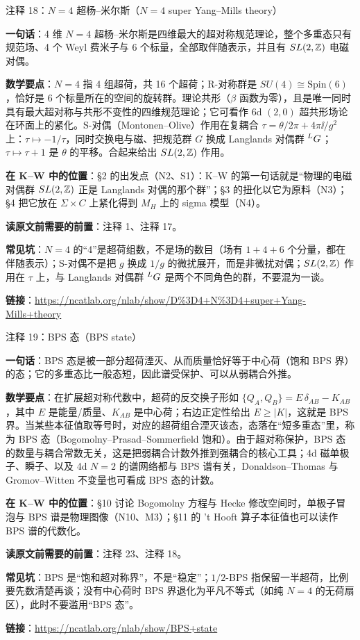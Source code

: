 \begin{kcard}{注释 18：$N=4$ 超杨--米尔斯（$N=4$ super Yang--Mills theory）}

\textbf{一句话}：4 维 $N=4$ 超杨--米尔斯是四维最大的超对称规范理论，整个多重态只有规范场、4 个 Weyl 费米子与 6 个标量，全部取伴随表示，并且有 $SL(2,\mathbb{Z})$ 电磁对偶。

\textbf{数学要点}：$N=4$ 指 4 组超荷，共 16 个超荷；R-对称群是 $SU(4)\cong \mathrm{Spin}(6)$，恰好是 6 个标量所在的空间的旋转群。理论共形（$\beta$ 函数为零），且是唯一同时具有最大超对称与共形不变性的四维规范理论；它可看作 6d $(2,0)$ 超共形场论在环面上的紧化。S-对偶（Montonen--Olive）作用在复耦合 $\tau=\theta/2\pi+4\pi\ii/g^2$ 上：$\tau\mapsto-1/\tau$，同时交换电与磁、把规范群 $G$ 换成 Langlands 对偶群 ${}^{L}G$；$\tau\mapsto\tau+1$ 是 $\theta$ 的平移。合起来给出 $SL(2,\mathbb{Z})$ 作用。

\textbf{在 K--W 中的位置}：§2 的出发点（N2、S1）：K--W 的第一句话就是“物理的电磁对偶群 $SL(2,\mathbb{Z})$ 正是 Langlands 对偶的那个群”；§3 的扭化以它为原料（N3）；§4 把它放在 $\Sigma\times C$ 上紧化得到 $M_H$ 上的 sigma 模型（N4）。

\textbf{读原文前需要的前置}：注释 1、注释 17。

\textbf{常见坑}：$N=4$ 的“4”是超荷组数，不是场的数目（场有 $1+4+6$ 个分量，都在伴随表示）；S-对偶不是把 $g$ 换成 $1/g$ 的微扰展开，而是非微扰对偶；$SL(2,\mathbb{Z})$ 作用在 $\tau$ 上，与 Langlands 对偶群 ${}^{L}G$ 是两个不同角色的群，不要混为一谈。

\noindent\textbf{链接}：\url{https://ncatlab.org/nlab/show/D%3D4+N%3D4+super+Yang-Mills+theory}
\end{kcard}

\begin{kcard}{注释 19：BPS 态（BPS state）}

\textbf{一句话}：BPS 态是被一部分超荷湮灭、从而质量恰好等于中心荷（饱和 BPS 界）的态；它的多重态比一般态短，因此谱受保护、可以从弱耦合外推。

\textbf{数学要点}：在扩展超对称代数中，超荷的反交换子形如 $\{Q_A,Q_B\}=E\,\delta_{AB}-K_{AB}$，其中 $E$ 是能量/质量、$K_{AB}$ 是中心荷；右边正定性给出 $E\ge |K|$，这就是 BPS 界。当某些本征值取等号时，对应的超荷组合湮灭该态，态落在“短多重态”里，称为 BPS 态（Bogomolny--Prasad--Sommerfield 饱和）。由于超对称保护，BPS 态的数量与耦合常数无关，这是把弱耦合计数外推到强耦合的核心工具；4d 磁单极子、瞬子、以及 4d $N=2$ 的谱网络都与 BPS 谱有关，Donaldson--Thomas 与 Gromov--Witten 不变量也可看成 BPS 态的计数。

\textbf{在 K--W 中的位置}：§10 讨论 Bogomolny 方程与 Hecke 修改空间时，单极子冒泡与 BPS 谱是物理图像（N10、M3）；§11 的 't Hooft 算子本征值也可以读作 BPS 谱的代数化。

\textbf{读原文前需要的前置}：注释 23、注释 18。

\textbf{常见坑}：BPS 是“饱和超对称界”，不是“稳定”；$1/2$-BPS 指保留一半超荷，比例要先数清楚再谈；没有中心荷时 BPS 界退化为平凡不等式（如纯 $N=4$ 的无荷扇区），此时不要滥用“BPS 态”。

\noindent\textbf{链接}：\url{https://ncatlab.org/nlab/show/BPS+state}
\end{kcard}

